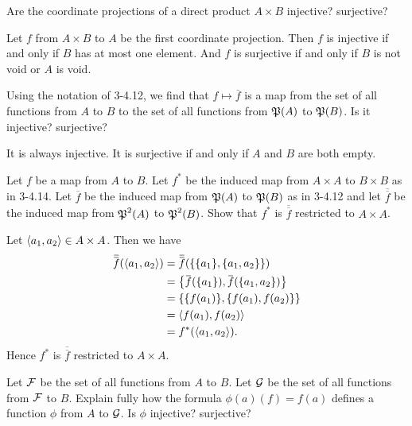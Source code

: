 \begin{exercise}
Are the coordinate projections of a direct product $A\times B$ injective? surjective?
\end{exercise}

\begin{solution}
Let $f$ from $A\times B$ to $A$ be the first coordinate projection.
Then $f$ is injective if and only if $B$ has at most one element.
And $f$ is surjective if and only if $B$ is not void or $A$ is void.
\end{solution}

\begin{exercise}
Using the notation of 3-4.12, we find that $f\mapsto \overbar f$
is a map from the set of all functions
from $A$ to $B$ to the set of all functions from $\operatorname{\mathfrak{P}}(A)$ to $\operatorname{\mathfrak{P}}(B)$.
Is it injective? surjective?
\end{exercise}

\begin{solution}
It is always injective. It is surjective if and only if $A$ and $B$ are both empty.
\end{solution}

\begin{exercise}
Let $f$ be a map from $A$ to $B$. Let $f^*$ be the induced map from $A\times A$ to $B\times B$ as
in 3-4.14. Let $\overbar f$ be the induced map from $\operatorname{\mathfrak{P}}(A)$ to $\operatorname{\mathfrak{P}}(B)$ as in 3-4.12
and let $\overbar{\overbar{f}}$ be the
induced map from $\operatorname{\mathfrak{P}}^2(A)$ to $\operatorname{\mathfrak{P}}^2(B)$.
Show that $f^*$ is $\overbar{\overbar{f}}$ restricted to $A \times A$. 
\end{exercise}

\begin{solution}
Let $\left\langle a_1,a_2\right\rangle\in A\times A$.
Then we have 
\[
\begin{aligned}
\overbar{\overbar{f}}(\aprn{a_1,a_2})
&=\overbar{\overbar{f}}(\set{\set{a_1},\set{a_1,a_2}})\\
&=\set{\overbar{f}(\set{a_1}), \overbar{f}(\set{a_1,a_2})}\\
&=\set{\set{f(a_1)}, \set{f(a_1),f(a_2)}}\\
&=\aprn{f(a_1),f(a_2)}\\
&=f^*(\aprn{a_1,a_2}).
\end{aligned}
\]
Hence $f^*$ is $\overbar{\overbar{f}}$ restricted to $A \times A$.
\end{solution}

\begin{exercise}
Let $\mathcal{F}$ be the set of all functions from $A$ to $B$.
Let $\mathcal{G}$ be the set of all functions from
$\mathcal{F}$ to $B$. Explain fully how the formula $\phi(a)(f)=f(a)$
defines a function $\phi$ from $A$ to $\mathcal{G}$.
Is $\phi$ injective? surjective?
\end{exercise}

